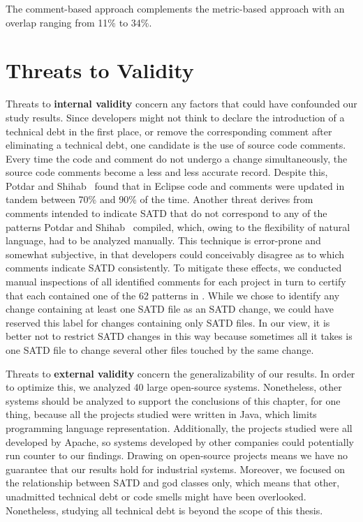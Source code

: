 \begin{myboxii}
	The comment-based approach complements the metric-based approach with an overlap ranging from 11\% to 34\%.
\end{myboxii}



\pagebreak



\section{Threats to Validity}
\label{chap4:sec:threats_to_validity}


Threats to \textbf{internal validity} concern any factors that could have confounded our study results. Since developers might not think to declare the introduction of a technical debt in the first place, or remove the corresponding comment after eliminating a technical debt, one candidate is the use of source code comments. Every time the code and comment do not undergo a change simultaneously, the source code comments become a less and less accurate record. Despite this, Potdar and Shihab~\cite{ICSM_PotdarS14} found that in Eclipse code and comments were updated in tandem between 70\% and 90\% of the time. Another threat derives from comments intended to indicate SATD that do not correspond to any of the patterns Potdar and Shihab~\cite{ICSM_PotdarS14} compiled, which, owing to the flexibility of natural language, had to be analyzed manually. This technique is error-prone and somewhat subjective, in that developers could conceivably disagree as to which comments indicate SATD consistently. To mitigate these effects, we conducted manual inspections of all identified comments for each project in turn to certify that each contained one of the 62 patterns in \cite{ICSM_PotdarS14}. While we chose to identify any change containing at least one SATD file as an SATD change, we could have reserved this label for changes containing only SATD files. In our view, it is better not to restrict SATD changes in this way because sometimes all it takes is one SATD file to change several other files touched by the same change.


Threats to \textbf{external validity} concern the generalizability of our results. In order to optimize this, we analyzed 40 large open-source systems. Nonetheless, other systems should be analyzed to support the conclusions of this chapter, for one thing, because all the projects studied were written in Java, which limits programming language representation. Additionally, the projects studied were all developed by Apache, so systems developed by other companies could potentially run counter to our findings. Drawing on open-source projects means we have no guarantee that our results hold for industrial systems. Moreover, we focused on the relationship between SATD and god classes only, which means that other, unadmitted technical debt or code smells might have been overlooked. Nonetheless, studying all technical debt is beyond the scope of this thesis.

